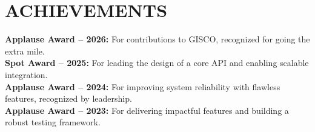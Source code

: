 \documentclass[]{deedy-resume-openfont}
\begin{document}
\begin{minipage}[t]{0.33\textwidth}
\section{ACHIEVEMENTS}

\href{https://shivasanthosh.github.io/aboutme/#achievements}{} \textbf{Applause Award – 2026:} For contributions to GISCO, recognized for going the extra mile. \\

\href{https://shivasanthosh.github.io/aboutme/#achievements}{} \textbf{Spot Award – 2025:} For leading the design of a core API and enabling scalable integration. \\

\href{https://shivasanthosh.github.io/aboutme/#achievements}{}  \textbf{Applause Award – 2024:} For improving system reliability with flawless features, recognized by leadership.  \\

\href{https://shivasanthosh.github.io/aboutme/#achievements}{}  \textbf{Applause Award – 2023:} For delivering impactful features and building a robust testing framework.






%
%

\end{minipage} 
\hfill
\end{document}
